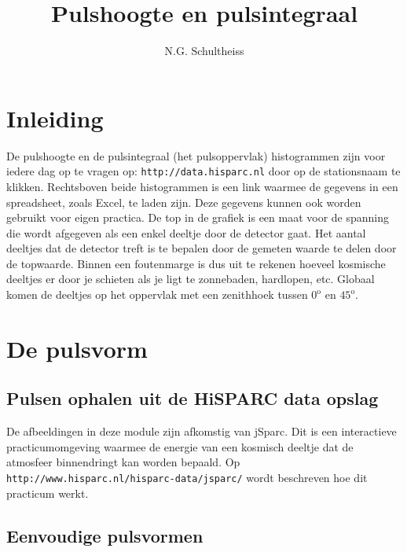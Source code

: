 



\title{Pulshoogte en pulsintegraal}


\author{N.G. Schultheiss}

\maketitle

\section{Inleiding}

De pulshoogte en de pulsintegraal (het pulsoppervlak) histogrammen
zijn voor iedere dag op te vragen op: \texttt{\small{http://data.hisparc.nl}}
door op de stationsnaam te klikken. Rechtsboven beide histogrammen
is een link waarmee de gegevens in een spreadsheet, zoals Excel\textregistered,
te laden zijn. Deze gegevens kunnen ook worden gebruikt voor eigen
practica. De top in de grafiek is een maat voor de spanning die wordt
afgegeven als een enkel deeltje door de detector gaat. Het aantal
deeltjes dat de detector treft is te bepalen door de gemeten waarde
te delen door de topwaarde. Binnen een foutenmarge is dus uit te rekenen
hoeveel kosmische deeltjes er door je schieten als je ligt te zonnebaden,
hardlopen, etc. Globaal komen de deeltjes op het oppervlak met een
zenithhoek tussen $0^{\mathrm{o}}$ en $45^{\mathrm{o}}$.


\section{De pulsvorm}


\subsection{Pulsen ophalen uit de HiSPARC data opslag}

De afbeeldingen in deze module zijn afkomstig van jSparc. Dit is een
interactieve practicumomgeving waarmee de energie van een kosmisch
deeltje dat de atmosfeer binnendringt kan worden bepaald. Op \texttt{\small{http://www.hisparc.nl/hisparc-data/jsparc/}}
wordt beschreven hoe dit practicum werkt.


\subsection{Eenvoudige pulsvormen}

